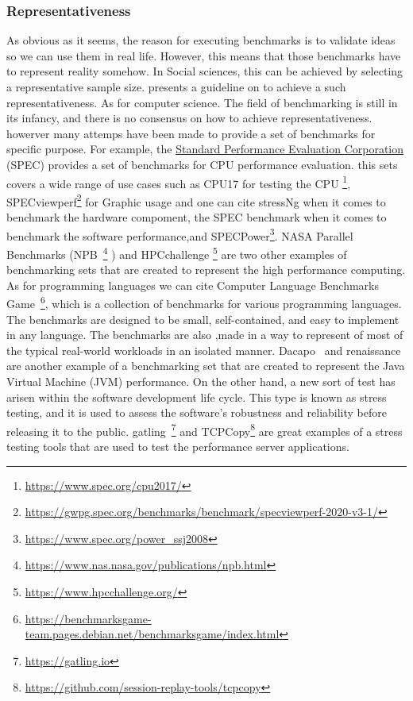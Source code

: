 \subsubsection{Representativeness}
As obvious as it seems, the reason for executing benchmarks is to validate ideas so we can use them in real life.
However, this means that those benchmarks have to represent reality somehow. In Social sciences, this can be achieved by selecting a representative sample size. \citeauthor{omair2014sample} presents a guideline on to achieve a such representativeness.
As for computer science. The field of benchmarking is still in its infancy, and there is no consensus on how to achieve representativeness. howerver many attemps have been made to provide a set of benchmarks for specific purpose.
For example, the \href{https://www.spec.org/}{Standard Performance Evaluation Corporation} (SPEC) provides a set of benchmarks for CPU performance evaluation. this sets covers a wide range of use cases such as  CPU17 for testing the CPU \footnote{\url{https://www.spec.org/cpu2017/}}, SPECviewperf\footnote{\url{https://gwpg.spec.org/benchmarks/benchmark/specviewperf-2020-v3-1/}} for Graphic usage and
one can cite stressNg when it comes to benchmark the hardware compoment, the SPEC benchmark when it comes to benchmark the software performance,and SPECPower\footnote{\url{https://www.spec.org/power_ssj2008} }.
NASA Parallel Benchmarks (NPB~\footnote{\url{https://www.nas.nasa.gov/publications/npb.html}} )
and HPCchallenge \footnote{\url{https://www.hpcchallenge.org/}} are two other examples of benchmarking sets that are created to represent the high performance computing.
As for programming languages we can cite Computer Language Benchmarks Game~\footnote{\url{https://benchmarksgame-team.pages.debian.net/benchmarksgame/index.html}}, which is a collection of benchmarks for various programming languages. The benchmarks are designed to be small, self-contained, and easy to implement in any language. The benchmarks are also ,made in a way to represent of most of the typical real-world workloads in an isolated manner.
Dacapo~\cite{blackburn2006dacapo} and renaissance~\cite{prokopec2019renaissance} are another example of a benchmarking set that are created to represent the Java Virtual Machine (JVM) performance.
On the other hand, a new sort of test has arisen within the software development life cycle. This type is known as stress testing, and it is used to assess the software's robustness and reliability before releasing it to the public. gatling~\footnote{\url{https://gatling.io}} and TCPCopy\footnote{\url{https://github.com/session-replay-tools/tcpcopy}} are great  examples of a stress testing tools that are used to test the performance server applications.

